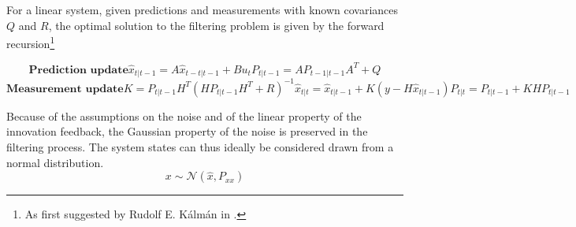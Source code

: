     \begin{algorithm}
        \label{alg:kf}
        For a linear system, given predictions and
        measurements with known covariances $Q$ and $R$, the optimal
        solution to the filtering problem is given by the forward recursion\footnote{As first suggested by Rudolf E. Kálmán in \cite{kalman1960}.}

        \begin{subequations}
            \textbf{Prediction update}
            \begin{equation}
                \hat{x}_{t|t-1} = A \hat{x}_{t-t|t-1} + B u_{t}
            \end{equation}
            \begin{equation}
                P_{t|t-1} = A P_{t-1|t-1} A^{T} + Q
            \end{equation}
        \end{subequations}
        \begin{subequations}
            \textbf{Measurement update}
            \begin{equation}
                \label{eq:observer:filtering:kalmanK}
                K = P_{t|t-1} H^{T} \left( H P_{t|t-1} H^{T} + R \right)^{-1}
            \end{equation}
            \begin{equation}
                \hat{x}_{t|t} = \hat{x}_{t|t-1} + K \left( y - H \hat{x}_{t|t-1} \right)
            \end{equation}
            \begin{equation}
                P_{t|t} = P_{t|t-1} + K H P_{t|t-1}
            \end{equation}
        \end{subequations}
    \end{algorithm}

    Because of the assumptions on the noise and of the linear property
    of the innovation feedback, the Gaussian property of the noise is preserved
    in the filtering process. The system states can thus ideally
    be considered drawn from a normal distribution.
    \begin{equation}
        x \sim \mathcal{N}\left(\hat{x}, P_{xx}\right)
    \end{equation}

